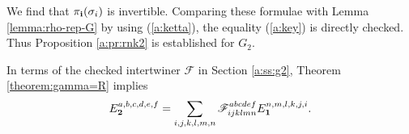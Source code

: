 We f\/ind that $\pi_{\bf i}(\sigma_i)$ is invertible.
Comparing these formulae with Lemma \ref{lemma:rho-rep-G}
by using (\ref{a:ketta}), the equality (\ref{a:key}) is directly checked.
Thus Proposition \ref{a:pr:rnk2} is established for $G_2$.

In terms of the checked intertwiner $\mathscr{F}$ in Section \ref{a:ss:g2},
Theorem \ref{theorem:gamma=R} implies
\begin{gather*}
E^{a,b,c,d,e,f}_{\bf 2} = \sum_{i,j,k,l,m,n}
\mathscr{F}^{a b c d e f}_{i j k l m n} E^{n,m,l,k,j,i}_{\bf 1}.
\end{gather*}

